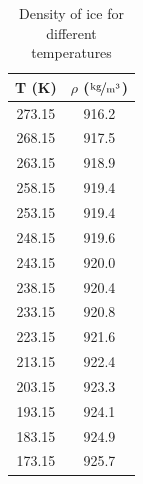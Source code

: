 \begin{table}
	\centering
	\begin{tabular}{|c|c|}
		\hline
		T (K) & $\rho$ ($\unitfrac{kg}{m^3}$) \\ \hline
		273.15 & 916.2 \\ \hline
		268.15 & 917.5 \\ \hline
		263.15 & 918.9 \\ \hline
		258.15 & 919.4 \\ \hline
		253.15 & 919.4 \\ \hline
		248.15 & 919.6 \\ \hline
		243.15 & 920.0 \\ \hline
		238.15 & 920.4 \\ \hline
		233.15 & 920.8 \\ \hline
		223.15 & 921.6 \\ \hline
		213.15 & 922.4 \\ \hline
		203.15 & 923.3 \\ \hline
		193.15 & 924.1 \\ \hline
		183.15 & 924.9 \\ \hline
		173.15 & 925.7 \\ \hline
	\end{tabular}
	\caption{Density of ice for different temperatures\cite{website:iceDensity}}
	\label{tab:ice_density}
\end{table}

